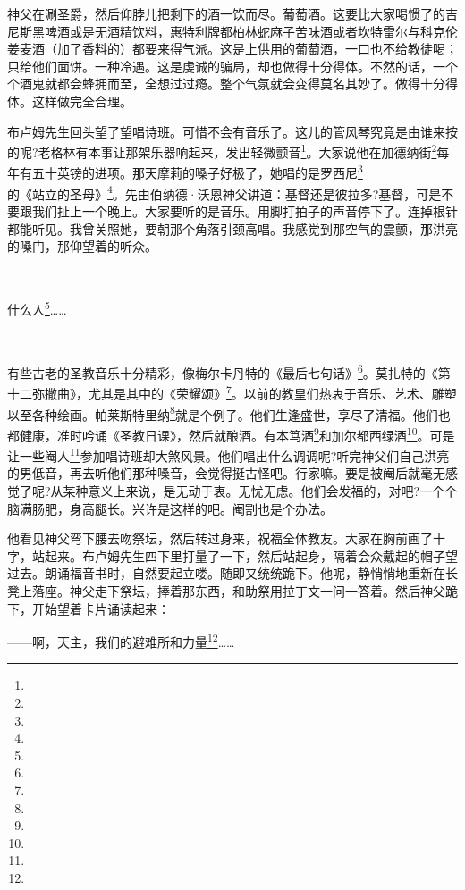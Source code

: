 \par 神父在涮圣爵，然后仰脖儿把剩下的酒一饮而尽。葡萄酒。这要比大家喝惯了的吉尼斯黑啤酒或是无酒精饮料，惠特利牌都柏林蛇麻子苦味酒或者坎特雷尔与科克伦姜麦酒（加了香料的）都要来得气派。这是上供用的葡萄酒，一口也不给教徒喝；只给他们面饼。一种冷遇。这是虔诚的骗局，却也做得十分得体。不然的话，一个个酒鬼就都会蜂拥而至，全想过过瘾。整个气氛就会变得莫名其妙了。做得十分得体。这样做完全合理。
\par 布卢姆先生回头望了望唱诗班。可惜不会有音乐了。这儿的管风琴究竟是由谁来按的呢?老格林有本事让那架乐器响起来，发出轻微颤音\footnote{}。大家说他在加德纳街\footnote{}每年有五十英镑的进项。那天摩莉的嗓子好极了，她唱的是罗西尼\footnote{}的《站立的圣母》\footnote{}。先由伯纳德·沃恩神父讲道：基督还是彼拉多?基督，可是不要跟我们扯上一个晚上。大家要听的是音乐。用脚打拍子的声音停下了。连掉根针都能听见。我曾关照她，要朝那个角落引颈高唱。我感觉到那空气的震颤，那洪亮的嗓门，那仰望着的听众。
\par  
\par 什么人\footnote{}……
\par  
\par 有些古老的圣教音乐十分精彩，像梅尔卡丹特的《最后七句话》\footnote{}。莫扎特的《第十二弥撒曲》，尤其是其中的《荣耀颂》\footnote{}。以前的教皇们热衷于音乐、艺术、雕塑以至各种绘画。帕莱斯特里纳\footnote{}就是个例子。他们生逢盛世，享尽了清福。他们也都健康，准时吟诵《圣教日课》，然后就酿酒。有本笃酒\footnote{}和加尔都西绿酒\footnote{}。可是让一些阉人\footnote{}参加唱诗班却大煞风景。他们唱出什么调调呢?听完神父们自己洪亮的男低音，再去听他们那种嗓音，会觉得挺古怪吧。行家嘛。要是被阉后就毫无感觉了呢?从某种意义上来说，是无动于衷。无忧无虑。他们会发福的，对吧?一个个脑满肠肥，身高腿长。兴许是这样的吧。阉割也是个办法。
\par 他看见神父弯下腰去吻祭坛，然后转过身来，祝福全体教友。大家在胸前画了十字，站起来。布卢姆先生四下里打量了一下，然后站起身，隔着会众戴起的帽子望过去。朗诵福音书时，自然要起立喽。随即又统统跪下。他呢，静悄悄地重新在长凳上落座。神父走下祭坛，捧着那东西，和助祭用拉丁文一问一答着。然后神父跪下，开始望着卡片诵读起来：
\par ——啊，天主，我们的避难所和力量\footnote{}……
